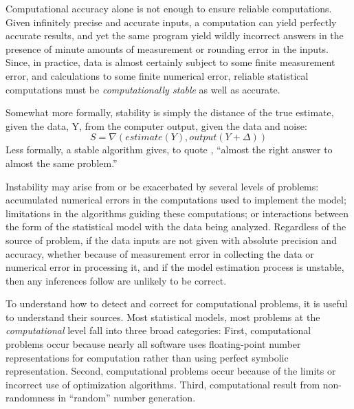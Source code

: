 \documentclass[11pt]{article}
\begin{document}
Computational accuracy alone is not enough to ensure reliable computations. Given infinitely precise and accurate inputs, a computation can yield perfectly accurate results, and yet the same program yield wildly incorrect answers in the presence of minute amounts of measurement or rounding
error in the inputs. Since, in practice, data is almost certainly subject to some finite measurement error, and calculations to some finite numerical error, reliable statistical computations must be \emph{computationally stable} as well as accurate.

Somewhat more formally, stability is simply the distance of the true estimate, given the data, Y, from the computer output, given the data and noise:
\begin{equation}
    S = \nabla \left(estimate\left(Y\right), output\left(Y+\Delta\right)\right)
\end{equation}
Less formally, a stable algorithm gives, to quote \citet{Higham02}, ``almost the right answer to almost the same problem.''
 
Instability may arise from or be exacerbated by several levels of problems: accumulated numerical errors in the computations used to implement the model; limitations in the algorithms guiding these computations; or interactions between the form of the statistical model with the data being analyzed. Regardless of the source of problem, if the data inputs are not given with absolute precision and accuracy, whether because of
measurement error in collecting the data or numerical error in processing it, and if the model estimation process is unstable, then any inferences follow are unlikely to be correct.
 
To understand how to detect and correct for computational problems, it is useful to understand their sources. Most statistical models, most problems at the \emph{computational} level fall into three broad categories: First, computational problems occur because nearly all software uses floating-point number representations for computation rather than using perfect symbolic representation. Second, computational problems occur because of the limits or incorrect use of optimization algorithms. Third, computational result from non-randomness in ``random'' number generation.
\end{document}
